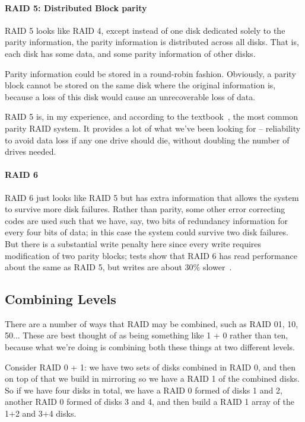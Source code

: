 \paragraph{RAID 5: Distributed Block parity}
RAID 5 looks like RAID 4, except instead of one disk dedicated solely to the parity information, the parity information is distributed across all disks. That is, each disk has some data, and some parity information of other disks.

Parity information could be stored in a round-robin fashion. Obviously, a parity block cannot be stored on the same disk where the original information is, because a loss of this disk would cause an unrecoverable loss of data. 

RAID 5 is, in my experience, and according to the textbook~\cite{osc}, the most common parity RAID system. It provides a lot of what we've been looking for -- reliability to avoid data loss if any one drive should die, without doubling the number of drives needed. 

\paragraph{RAID 6}

RAID 6 just looks like RAID 5 but has extra information that allows the system to survive more disk failures. Rather than parity, some other error correcting codes are used such that we have, say, two bits of redundancy information for every four bits of data; in this case the system could survive two disk failures. But there is a substantial write penalty here since every write requires modification of two parity blocks; tests show that RAID 6 has read performance about the same as RAID 5, but writes are about 30\% slower~\cite{osi}.

\subsection*{Combining Levels}

There are a number of ways that RAID may be combined, such as RAID 01, 10, 50... These are best thought of as being something like 1 + 0 rather than ten, because what we're doing is combining both these things at two different levels. 

Consider RAID 0 + 1: we have two sets of disks combined in RAID 0, and then on top of that we build in mirroring so we have a RAID 1 of the combined disks. So if we have four disks in total, we have a RAID 0 formed of disks 1 and 2, another RAID 0 formed of disks 3 and 4, and then build a RAID 1 array of the 1+2 and 3+4 disks. 

